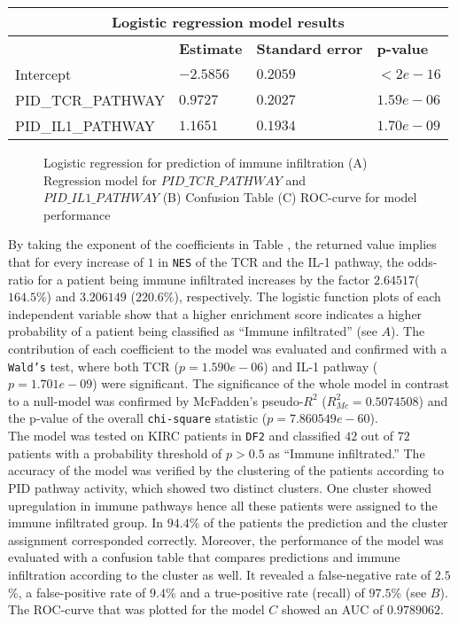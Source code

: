 \documentclass[
  parskip,
  openany]{scrreprt}
\begin{document}
\begin{table}[ht]
  \begin{center}
 \begin{tabular}{ |p{4.5cm}||p{3cm}|p{3cm}|p{3cm}|  }
  \hline
  \multicolumn{4}{|c|}{Logistic regression model results} \\
  \hline
   & \textbf{Estimate} & \textbf{Standard error} & \textbf{p-value}\\
  \hline
  Intercept   &  $-2.5856$  & $0.2059$ &   $<2e-16$\\
  PID\_TCR\_PATHWAY &   $0.9727$  & $0.2027$   & $1.59e-06$\\
  PID\_IL1\_PATHWAY & $1.1651$ & $0.1934$ &  $1.70e-09$\\
 \hline
 \end{tabular}
 \end{center}
 \label{tab}
\end{table}

\begin{figure}[ht]
  \scalebox{.5}{}
  \caption{Logistic regression for prediction of immune infiltration (A) Regression model for $PID\_TCR\_PATHWAY$ and $PID\_IL1\_PATHWAY$ (B) Confusion Table (C) ROC-curve for model performance}
  \label{log}
\end{figure}

By taking the exponent of the coefficients in Table , the
returned value implies that for every increase of \(1\) in \texttt{NES}
of the TCR and the IL-1 pathway, the odds-ratio for a patient being
immune infiltrated increases by the factor \(2.64517\)(\(164.5\%\)) and
\(3.206149\) (\(220.6\%\)), respectively. The logistic function plots of
each independent variable show that a higher enrichment score indicates
a higher probability of a patient being classified as ``Immune
infiltrated'' (see  \(A\)). The contribution of each
coefficient to the model was evaluated and confirmed with a
\texttt{Wald’s} test, where both TCR (\(p= 1.590e-06\)) and IL-1 pathway
(\(p= 1.701e-09\)) were significant. The significance of the whole model
in contrast to a null-model was confirmed by McFadden's pseudo-\(R^2\)
(\(R_{Mc}^2=0.5074508\)) and the p-value of the overall
\texttt{chi-square} statistic (\(p=7.860549e-60\)).\\
The model was tested on KIRC patients in \texttt{DF2} and classified
\(42\) out of \(72\) patients with a probability threshold of
\(p > 0.5\) as ``Immune infiltrated.'' The accuracy of the model was
verified by the clustering of the patients according to PID pathway
activity, which showed two distinct clusters. One cluster showed
upregulation in immune pathways hence all these patients were assigned
to the immune infiltrated group. In \(94.4\)\% of the patients the
prediction and the cluster assignment corresponded correctly. Moreover,
the performance of the model was evaluated with a confusion table that
compares predictions and immune infiltration according to the cluster as
well. It revealed a false-negative rate of \(2.5\)\%, a false-positive
rate of \(9.4\)\% and a true-positive rate (recall) of \(97.5\)\% (see
 \(B\)). The ROC-curve that was plotted for the model
\(C\) showed an AUC of \(0.9789062\).
\end{document}
